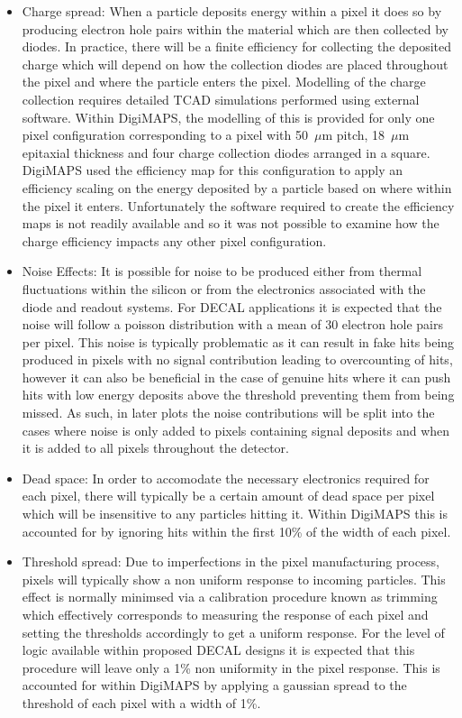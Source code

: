 \begin{itemize}
\item Charge spread: When a particle deposits energy within a pixel it does so by producing electron hole pairs within the material which are then collected by diodes. In practice, there will be a finite efficiency for collecting the deposited charge which will depend on how the collection diodes are placed throughout the pixel and where the particle enters the pixel. Modelling of the charge collection requires detailed TCAD simulations performed using external software. Within DigiMAPS, the modelling of this is provided for only one pixel configuration corresponding to a pixel with 50~$\mu$m pitch, 18~$\mu$m epitaxial thickness and four charge collection diodes arranged in a square. DigiMAPS used the efficiency map for this configuration to apply an efficiency scaling on the energy deposited by a particle based on where within the pixel it enters. Unfortunately the software required to create the efficiency maps is not readily available and so it was not possible to examine how the charge efficiency impacts any other pixel configuration.
  
\item Noise Effects: It is possible for noise to be produced either from thermal fluctuations within the silicon or from the electronics associated with the diode and readout systems. For \ac{DECAL} applications it is expected that the noise will follow a poisson distribution with a mean of 30 electron hole pairs per pixel. This noise is typically problematic as it can result in fake hits being produced in pixels with no signal contribution leading to overcounting of hits, however it can also be beneficial in the case of genuine hits where it can push hits with low energy deposits above the threshold preventing them from being missed. As such, in later plots the noise contributions will be split into the cases where noise is only added to pixels containing signal deposits and when it is added to all pixels throughout the detector.
  
\item Dead space: In order to accomodate the necessary electronics required for each pixel, there will typically be a certain amount of dead space per pixel which will be insensitive to any particles hitting it. Within DigiMAPS this is accounted for by ignoring hits within the first 10\% of the width of each pixel.
  
\item Threshold spread: Due to imperfections in the pixel manufacturing process, pixels will typically show a non uniform response to incoming particles. This effect is normally minimsed via a calibration procedure known as trimming which effectively corresponds to measuring the response of each pixel and setting the thresholds accordingly to get a uniform response. For the level of logic available within proposed \ac{DECAL} designs it is expected that this procedure will leave only a 1\% non uniformity in the pixel response. This is accounted for within DigiMAPS by applying a gaussian spread to the threshold of each pixel with a width of 1\%.
  

\end{itemize}
